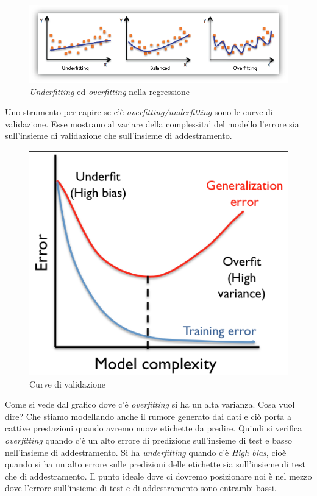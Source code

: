 \begin{figure}[H]
	\centering
	\includegraphics[width=1\linewidth]{img/underfittingoverfitting}
	\caption{\textit{Underfitting} ed \textit{overfitting} nella regressione}
	\label{fig:underfittingoverfitting}
\end{figure}

Uno strumento per capire se  c'\`e \textit{overfitting/underfitting} sono le curve di validazione. Esse mostrano al variare della complessita' del modello l'errore sia sull'insieme di validazione che sull'insieme di addestramento.

\begin{figure}[H]
	\centering
	\includegraphics[width=0.7\linewidth]{img/validation_curve}
	\caption{Curve di validazione}
	\label{fig:validationcurve}
\end{figure}

Come si vede dal grafico dove c'\`e \textit{overfitting} si ha un alta varianza. Cosa vuol dire? Che stiamo modellando anche il rumore generato dai dati e ci\`o porta a cattive prestazioni quando avremo nuove etichette da predire. Quindi si verifica \textit{overfitting} quando c'\`e un alto errore di predizione sull'insieme di test e basso nell'insieme di addestramento. Si ha \textit{underfitting} quando c'\`e \textit{High bias}, cio\`e quando si ha un alto errore sulle predizioni delle etichette sia sull'insieme di test che di addestramento. Il punto ideale dove ci dovremo posizionare noi \`e nel mezzo dove l'errore sull'insieme di test e di addestramento sono entrambi bassi.

